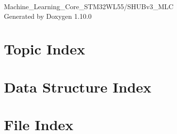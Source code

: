 \documentclass[twoside]{book}
\newcommand{\+}{\discretionary{\mbox{\scriptsize$\hookleftarrow$}}{}{}}
\newcommand{\clearemptydoublepage}{%
    \newpage{\pagestyle{empty}\cleardoublepage}%
  }
\begin{document}
  \raggedbottom
    \hypersetup{pageanchor=false,
                bookmarksnumbered=true,
                pdfencoding=unicode
               }
  \begin{titlepage}
  \vspace*{7cm}
  \begin{center}%
  {\Large Machine\+\_\+\+Learning\+\_\+\+Core\+\_\+\+STM32\+WL55/\+SHUBv3\+\_\+\+MLC}\\
  \vspace*{1cm}
  {\large Generated by Doxygen 1.10.0}\\
  \end{center}
  \end{titlepage}
  \clearemptydoublepage
  \tableofcontents
  \clearemptydoublepage
  \hypersetup{pageanchor=true}



\chapter{Topic Index}

\chapter{Data Structure Index}

\chapter{File Index}

\end{document}
